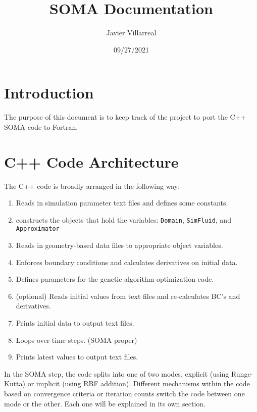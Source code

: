 \documentclass[12pt]{article}
\begin{document}
    \title{SOMA Documentation}
    \author{Javier Villarreal}
    \date{09/27/2021}
    \maketitle

    \section{Introduction}
        The purpose of this document is to keep track of the project to port the C++ SOMA code to Fortran.

    \section{C++ Code Architecture}
        The C++ code is broadly arranged in the following way:
        \begin{enumerate}
            \item Reads in simulation parameter text files and defines some constants.
            \item constructs the objects that hold the variables: \texttt{Domain}, \texttt{SimFluid}, and \texttt{Approximator}
            \item Reads in geometry-based data files to appropriate object variables.
            \item Enforces boundary conditions and calculates derivatives on initial data.
            \item Defines parameters for the genetic algorithm optimization code.
            \item (optional) Reads initial values from text files and re-calculates BC's and derivatives.
            \item Prints initial data to output text files.
            \item Loops over time steps. (SOMA proper)
            \item Prints latest values to output text files.
        \end{enumerate}
        In the SOMA step, the code splits into one of two modes, explicit (using Runge-Kutta) or implicit (using RBF addition). Different mechanisms within the code based on convergence criteria or iteration counts switch the code between one mode or the other. Each one will be explained in its own section.
\end{document}

